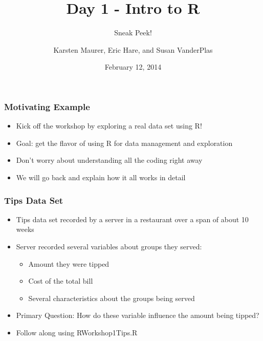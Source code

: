 \documentclass{beamer}\usepackage[]{graphicx}\usepackage[]{color}
\title[ 1-Intro]{Day 1 - Intro to R}
\subtitle{Sneak Peek!}
\author[ K. Maurer, S. VanderPlas, E. Hare]{Karsten Maurer, Eric Hare, and Susan VanderPlas}
\date{February 12, 2014}
\institute[ISU]{Iowa State University}
\begin{document}
\begin{frame}
    \maketitle
\end{frame}


\begin{frame}
    \frametitle{Motivating Example}
    \begin{itemize}
        \item Kick off the workshop by exploring a real data set using R!
        \item Goal: get the flavor of using R for data management and exploration
        \item Don't worry about understanding all the coding right away
        \item We will go back and explain how it all works in detail
    \end{itemize}    
\end{frame}


\begin{frame}
    \frametitle{Tips Data Set}
    \begin{itemize}
        \item Tips data set recorded by a server in a restaurant over a span of about 10 weeks
        \item Server recorded several variables about groups they served:
        \begin{itemize} 
          \item Amount they were tipped
          \item Cost of the total bill
          \item Several characteristics about the groups being served
        \end{itemize}
        \item Primary Question: How do these variable influence the amount being tipped?
        \item Follow along using RWorkshop1Tips.R
    \end{itemize}    
\end{frame}

\end{document}

